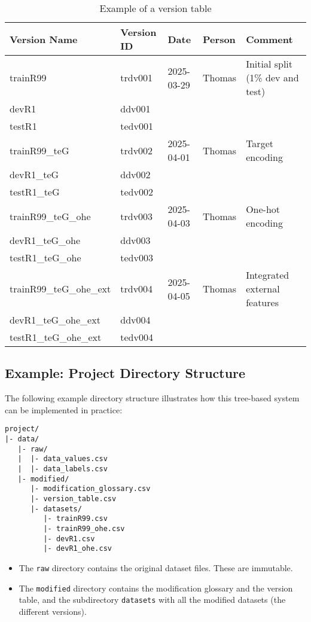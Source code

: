 \documentclass[12pt,openany]{book}
\begin{document}
\begin{table}[H]
\centering
\renewcommand{\arraystretch}{1.3}
\caption{Example of a version table}
\label{tab:dataset_versions}
\begin{tabular}{|l|l|p{2.5cm}|p{2.5cm}|p{5.5cm}|}
\hline
\textbf{Version Name} & \textbf{Version ID} & \textbf{Date} & \textbf{Person} & \textbf{Comment} \\
\hline
trainR99 & trdv001 & 2025-03-29 & Thomas & Initial split (1\% dev and test) \\
devR1 & ddv001 & & & \\
testR1 & tedv001 & & & \\
\hline
trainR99\_teG & trdv002 & 2025-04-01 & Thomas & Target encoding \\
devR1\_teG & ddv002 & & & \\
testR1\_teG & tedv002 & & & \\
\hline
trainR99\_teG\_ohe & trdv003 & 2025-04-03 & Thomas & One-hot encoding \\
devR1\_teG\_ohe & ddv003 & & & \\
testR1\_teG\_ohe & tedv003 & & & \\
\hline
trainR99\_teG\_ohe\_ext & trdv004 & 2025-04-05 & Thomas & Integrated external features \\
devR1\_teG\_ohe\_ext & ddv004 & & & \\
testR1\_teG\_ohe\_ext & tedv004 & & & \\
\hline
\end{tabular}
\end{table}


\subsection{Example: Project Directory Structure}

The following example directory structure illustrates how this tree-based system can be implemented in practice:

\begin{verbatim}
project/
|- data/
   |- raw/
   |  |- data_values.csv
   |  |- data_labels.csv
   |- modified/
      |- modification_glossary.csv
      |- version_table.csv
      |- datasets/
         |- trainR99.csv
         |- trainR99_ohe.csv
         |- devR1.csv
         |- devR1_ohe.csv
\end{verbatim}

\begin{itemize}
    \item The \texttt{raw} directory contains the original dataset files. These are immutable.
    \item The \texttt{modified} directory contains the modification glossary and the version table, and the subdirectory \texttt{datasets} with all the modified datasets (the different versions).
\end{itemize}
\end{document}
